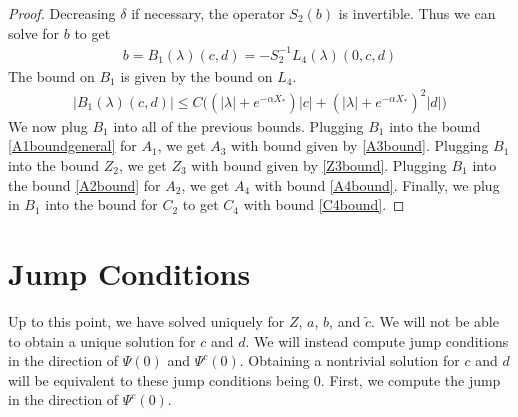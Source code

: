 \documentclass[thesis.tex]{subfiles}
\begin{document}
\begin{lemma}
\begin{proof}
Decreasing $\delta$ if necessary, the operator $S_2(b)$ is invertible. Thus we can solve for $b$ to get
\begin{align}
b = B_1(\lambda)(c,d) 
= -S_2^{-1} L_4(\lambda)(0, c, d)
\end{align}
The bound on $B_1$ is given by the bound on $L_4$.
\begin{align*}
|B_1(\lambda)(c, d)| \leq C\Big( (|\lambda| + e^{-\alpha X_*})|c| + (|\lambda| + e^{-\alpha X_*})^2 |d| \Big) 
\end{align*}
We now plug $B_1$ into all of the previous bounds. Plugging $B_1$ into the bound \eqref{A1boundgeneral} for $A_1$, we get $A_3$ with bound given by \cref{A3bound}. Plugging $B_1$ into the bound $Z_2$, we get $Z_3$ with bound given by \cref{Z3bound}. Plugging $B_1$ into the bound \eqref{A2bound} for $A_2$, we get $A_4$ with bound \cref{A4bound}. Finally, we plug in $B_1$ into the bound for $C_2$ to get $C_4$ with bound \cref{C4bound}.
\end{proof}
\end{lemma}

\section{Jump Conditions}

Up to this point, we have solved uniquely for $Z$, $a$, $b$, and $\tilde{c}$. We will not be able to obtain a unique solution for $c$ and $d$. We will instead compute jump conditions in the direction of $\Psi(0)$ and $\Psi^c(0)$. Obtaining a nontrivial solution for $c$ and $d$ will be equivalent to these jump conditions being 0. First, we compute the jump in the direction of $\Psi^c(0)$. 
\end{document}
